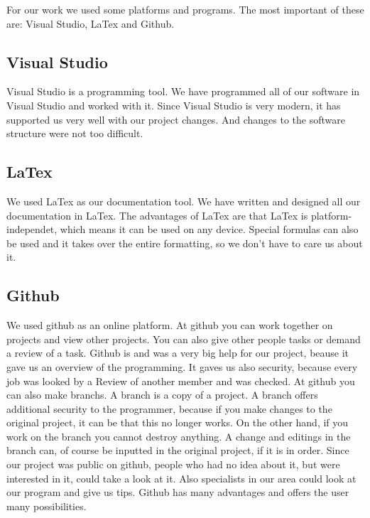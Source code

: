 For our work we used some platforms and programs. The most important of these are: Visual Studio, LaTex and Github.\\

\subsection {Visual Studio}

Visual Studio is a programming tool. We have programmed all of our software in Visual Studio and worked with it. Since Visual Studio is very modern, it has supported us very well with our project changes. And changes to the software structure were not too difficult.

\subsection {LaTex}

We used LaTex as our documentation tool. We have written and designed all our documentation in LaTex. The advantages of LaTex are that LaTex is platform-independet, which means it can be used on any device. Special formulas can also be used and it takes over the entire formatting, so we don’t have to care us about it.

\subsection {Github}

We used github as an online platform. At github you can work together on projects and view other projects. You can also give other people tasks or demand a review of a task. Github is and was a very big help for our project, beause it gave us an overview of the programming. It gaves us also security, because every job was looked by a Review of another member and was checked. 
At github you can also make branchs. A branch is a copy of a project. A branch offers additional security to the programmer, because if you make changes to the original project, it can be that this no longer works. On the other hand, if you work on the branch you cannot destroy anything. 
A change and editings in the branch can, of course be inputted in the original project, if it is in order. Since our project was public on github, people who had no idea about it, but were interested in it, could take a look at it. 
Also specialists in our area could look at our program and give us tips. Github has many advantages and offers the user many possibilities.

